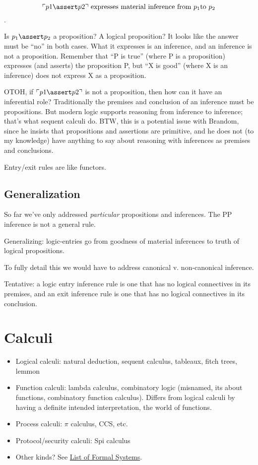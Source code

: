 \documentclass{article}
\begin{document}
\[\ulcorner p1\linfer p2\urcorner\ \text{expresses
material inference from}\ p_1 \text{to}\ p_2\].

Is \(p_1\linfer p_2\) a proposition? A logical proposition? It looks like
the answer must be ``no'' in both cases. What it expresses is an
inference, and an inference is not a proposition. Remember that ``P is
true'' (where P is a proposition) expresses (and asserts) the
proposition P, but ``X is good'' (where X is an inference) does not
express X as a proposition.

OTOH, if \(\ulcorner p1\linfer p2\urcorner\) is not a proposition, then
how can it have an inferential role? Traditionally the premises and
conclusion of an inference must be propositions. But modern logic
supports reasoning from inference to inference; that's what sequent
calculi do. BTW, this is a potential issue with Brandom, since he
insists that propositions and assertions are primitive, and he does
not (to my knowledge) have anything to say about reasoning with
inferences as premises and conclusions.

Entry/exit rules are like functors.

\subsection{Generalization}

So far we've only addressed \textit{particular} propositions and
inferences.  The PP inference is not a general rule.

Generalizing: logic-entries go from goodness of material inferences to
truth of logical propositions.

To fully detail this we would have to address canonical v.
non-canonical inference.

Tentative: a logic entry inference rule is one that has no logical
connectives in its premises, and an exit inference rule is one that
has no logical connectives in its conclusion.


\section{Calculi}

\begin{itemize}
\item Logical calculi: natural deduction, sequent calculus, tableaux, fitch trees, lemmon
\item Function calculi: lambda calculus, combinatory logic (misnamed, its
about functions, combinatory function calculus). Differs from logical
calculi by having a definite intended interpretation, the world of
functions.
\item Process calculi: \(\pi\) calculus, CCS, etc.
\item Protocol/security calculi: Spi calculus
\item Other kinds?  See \href{https://en.wikipedia.org/wiki/List_of_formal_systems}{List of Formal Systems}.
\end{itemize}
\end{document}
